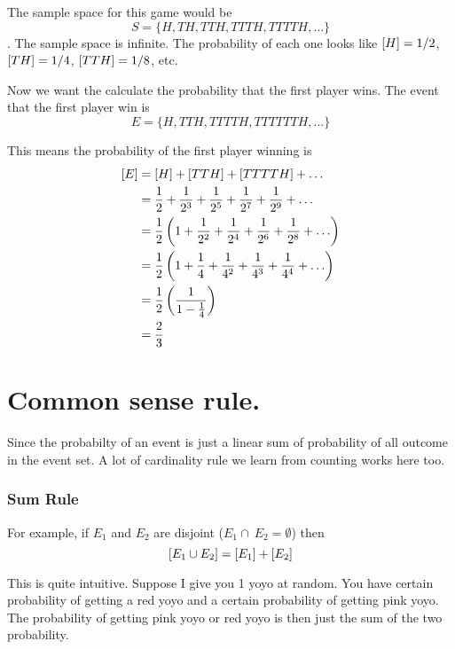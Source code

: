 \documentclass[a4paper, 12pt]{article}
\newcommand{\half}{\ensuremath{\frac{1}{2}}}
\let\Pr\relax
\DeclareMathOperator{\Pr}{Pr}
\begin{document}
\begin{multicols}{2}
The sample space for this game would be
\[
S = \{H, TH, TTH, TTTH, TTTTH, \ldots\}
\]. The sample space is infinite. The probability of each one looks like  $\Pr[H] = 1/2$, $\Pr[TH] = 1/4$, $\Pr[TTH] = 1/8$, etc. 

Now we want the calculate the probability that the first player wins. The event that the first player win is \[
E = \{H, TTH, TTTTH, TTTTTTH, \ldots \}
\]

This means the probability of the first player winning is
\begin{align*}
	\Pr[E] &= \Pr[H] + \Pr[TTH] + \Pr[TTTTH] + \ldots\\
	&= \frac{1}{2} + \frac{1}{2^3} + \frac{1}{2^5} + \frac{1}{2^7} + \frac{1}{2^9}+\ldots \\
	&= \frac{1}{2} \left( 1 + \frac{1}{2^2} + \frac{1}{2^4} + \frac{1}{2^6} + \frac{1}{2^8} + \ldots \right)\\
	&= \frac{1}{2} \left( 1 + \frac{1}{4} + \frac{1}{4^2} + \frac{1}{4^3} + \frac{1}{4^4} + \ldots \right)\\
	&= \half \left(\frac{1}{1-\frac{1}{4}}\right)\\
	&= \frac{2}{3}
\end{align*}

\section*{Common sense rule.}

Since the probabilty of an event is just a linear sum of probability of all outcome in the event set. A lot of cardinality rule we learn from counting works here too.

\subsubsection*{Sum Rule}
For example, if $E_1$ and $E_2$ are disjoint ($E_1\cap~E_2=\emptyset$) then
\[
	\Pr\left[E_1 \cup E_2\right] = \Pr[E_1] +  \Pr[E_2]
\]

\begin{center}
\end{center}

This is quite intuitive. Suppose I give you 1 yoyo at random. You have certain probability of getting a red yoyo and a certain probability of getting pink yoyo. The probability of getting pink yoyo or red yoyo is then just the sum of the two probability.


\end{multicols}
\end{document}
